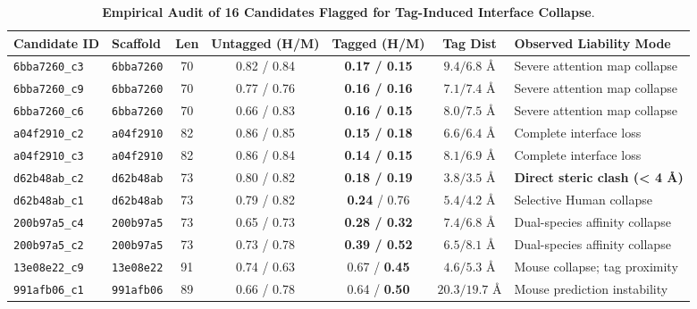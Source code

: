 \documentclass[11pt]{article}
\begin{document}
\begin{table}[htbp]
\centering
\footnotesize
\caption{\textbf{Empirical Audit of 16 Candidates Flagged for Tag-Induced Interface Collapse}.}
\label{tab:tag_failures}
\begin{tabularx}{\textwidth}{p{2.5cm}p{1.4cm}ccccX}
\toprule
\textbf{Candidate ID} & \textbf{Scaffold} & \textbf{Len} & \textbf{Untagged (H/M)} & \textbf{Tagged (H/M)} & \textbf{Tag Dist} & \textbf{Observed Liability Mode} \\
\midrule
\texttt{\scriptsize 6bba7260\_c3} & \texttt{6bba7260} & 70 & 0.82 / 0.84 & \textbf{0.17 / 0.15} & $9.4 / 6.8\text{ \AA}$ & Severe attention map collapse \\
\texttt{\scriptsize 6bba7260\_c9} & \texttt{6bba7260} & 70 & 0.77 / 0.76 & \textbf{0.16 / 0.16} & $7.1 / 7.4\text{ \AA}$ & Severe attention map collapse \\
\texttt{\scriptsize 6bba7260\_c6} & \texttt{6bba7260} & 70 & 0.66 / 0.83 & \textbf{0.16 / 0.15} & $8.0 / 7.5\text{ \AA}$ & Severe attention map collapse \\
\texttt{\scriptsize a04f2910\_c2} & \texttt{a04f2910} & 82 & 0.86 / 0.85 & \textbf{0.15 / 0.18} & $6.6 / 6.4\text{ \AA}$ & Complete interface loss \\
\texttt{\scriptsize a04f2910\_c3} & \texttt{a04f2910} & 82 & 0.86 / 0.84 & \textbf{0.14 / 0.15} & $8.1 / 6.9\text{ \AA}$ & Complete interface loss \\
\texttt{\scriptsize d62b48ab\_c2} & \texttt{d62b48ab} & 73 & 0.80 / 0.82 & \textbf{0.18 / 0.19} & \textbf{$3.8 / 3.5\text{ \AA}$} & \textbf{Direct steric clash (< 4 \AA)} \\
\texttt{\scriptsize d62b48ab\_c1} & \texttt{d62b48ab} & 73 & 0.79 / 0.82 & \textbf{0.24} / 0.76 & $5.4 / 4.2\text{ \AA}$ & Selective Human collapse \\
\texttt{\scriptsize 200b97a5\_c4} & \texttt{200b97a5} & 73 & 0.65 / 0.73 & \textbf{0.28 / 0.32} & $7.4 / 6.8\text{ \AA}$ & Dual-species affinity collapse \\
\texttt{\scriptsize 200b97a5\_c2} & \texttt{200b97a5} & 73 & 0.73 / 0.78 & \textbf{0.39 / 0.52} & $6.5 / 8.1\text{ \AA}$ & Dual-species affinity collapse \\
\texttt{\scriptsize 13e08e22\_c9} & \texttt{13e08e22} & 91 & 0.74 / 0.63 & 0.67 / \textbf{0.45} & $4.6 / 5.3\text{ \AA}$ & Mouse collapse; tag proximity \\
\texttt{\scriptsize 991afb06\_c1} & \texttt{991afb06} & 89 & 0.66 / 0.78 & 0.64 / \textbf{0.50} & $20.3 / 19.7\text{ \AA}$ & Mouse prediction instability \\

\end{tabularx}
\end{table}
\end{document}
